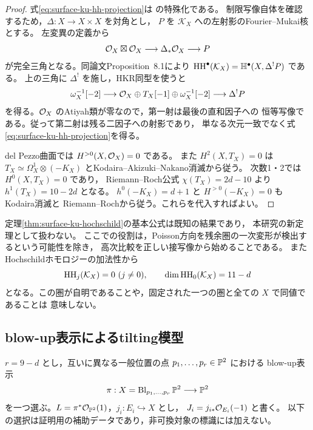 \begin{proof}
式\eqref{eq:surface-ku-hh-projection}は
\cite[Theorem~8.5]{KuznetsovHH2009}の特殊化である。
制限写像自体を確認するため，$\Delta:X\to X\times X$ を対角とし，
$P$ を $\mathcal K_X$ への左射影のFourier--Mukai核とする。
左変異の定義から
\[
 \mathcal O_X\boxtimes\mathcal O_X\longrightarrow\Delta_*\mathcal O_X\longrightarrow P
\]
が完全三角となる。同論文Proposition~8.1により
$\operatorname{HH}^\bullet(\mathcal K_X)=\mathbb H^\bullet(X,\Delta^!P)$ である。
上の三角に $\Delta^!$ を施し，HKR同型を使うと
\[
 \omega_X^{-1}[-2]\longrightarrow
 \mathcal O_X\oplus T_X[-1]\oplus\omega_X^{-1}[-2]
 \longrightarrow\Delta^!P
\]
を得る。$\mathcal O_X$ のAtiyah類が零なので，第一射は最後の直和因子への
恒等写像である。従って第二射は残る二因子への射影であり，
単なる次元一致でなく式\eqref{eq:surface-ku-hh-projection}を得る。

del Pezzo曲面では $H^{>0}(X,\mathcal O_X)=0$ である。
また $H^2(X,T_X)=0$ は
$T_X\simeq\Omega_X^1\otimes(-K_X)$ とKodaira--Akizuki--Nakano消滅から従う。
次数1・2では $H^0(X,T_X)=0$ であり，
Riemann--Roch公式 $\chi(T_X)=2d-10$ より
$h^1(T_X)=10-2d$ となる。
$h^0(-K_X)=d+1$ と $H^{>0}(-K_X)=0$ もKodaira消滅と
Riemann--Rochから従う。これらを代入すればよい。
\end{proof}

\begin{remark}[既知結果と今回の帰結]
定理\ref{thm:surface-ku-hochschild}の基本公式は既知の結果であり，
本研究の新定理として扱わない。
ここでの役割は，Poisson方向を残余圏の一次変形が検出するという可能性を除き，
高次比較を正しい接写像から始めることである。
またHochschildホモロジーの加法性から
\[
 \operatorname{HH}_j(\mathcal K_X)=0\ (j\ne0),\qquad
 \dim\operatorname{HH}_0(\mathcal K_X)=11-d
\]
となる。この圏が自明であることや，固定された一つの圏と全ての $X$ で同値であることは
意味しない。
\end{remark}

\subsection{blow-up表示によるtilting模型}

$r=9-d$ とし，互いに異なる一般位置の点 $p_1,\ldots,p_r\in\mathbb P^2$ における
blow-up表示
\[
 \pi:X=\operatorname{Bl}_{p_1,\ldots,p_r}\mathbb P^2\longrightarrow\mathbb P^2
\]
を一つ選ぶ。$L=\pi^*\mathcal O_{\mathbb P^2}(1)$，$j_i:E_i\hookrightarrow X$ とし，
$J_i=j_{i*}\mathcal O_{E_i}(-1)$ と書く。
以下の選択は証明用の補助データであり，非可換対象の標識には加えない。

